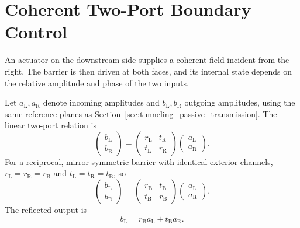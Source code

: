 \section{Coherent Two-Port Boundary Control}
\label{sec:tunneling_coherent_boundary_control}

An actuator on the downstream side supplies a coherent field incident from the right. The barrier is then driven at both faces, and its internal state depends on the relative amplitude and phase of the two inputs.

Let $a_{\mathrm L},a_{\mathrm R}$ denote incoming amplitudes and $b_{\mathrm L},b_{\mathrm R}$ outgoing amplitudes, using the same reference planes as \hyperref[sec:tunneling_passive_transmission]{Section~\ref*{sec:tunneling_passive_transmission}}. The linear two-port relation is
\begin{equation}
    \begin{pmatrix}b_{\mathrm L}\\b_{\mathrm R}\end{pmatrix}
    =
    \begin{pmatrix}
        r_{\mathrm L}&t_{\mathrm R}\\
        t_{\mathrm L}&r_{\mathrm R}
    \end{pmatrix}
    \begin{pmatrix}a_{\mathrm L}\\a_{\mathrm R}\end{pmatrix}.
    \label{eq:tunneling_scattering_matrix_general}
\end{equation}
For a reciprocal, mirror-symmetric barrier with identical exterior channels,
$r_{\mathrm L}=r_{\mathrm R}=r_{\mathrm B}$ and
$t_{\mathrm L}=t_{\mathrm R}=t_{\mathrm B}$, so
\begin{equation}
    \begin{pmatrix}b_{\mathrm L}\\b_{\mathrm R}\end{pmatrix}
    =
    \begin{pmatrix}
        r_{\mathrm B}&t_{\mathrm B}\\
        t_{\mathrm B}&r_{\mathrm B}
    \end{pmatrix}
    \begin{pmatrix}a_{\mathrm L}\\a_{\mathrm R}\end{pmatrix}.
    \label{eq:tunneling_scattering_matrix_symmetric}
\end{equation}
The reflected output is
\begin{equation}
    b_{\mathrm L}
    =r_{\mathrm B}a_{\mathrm L}+t_{\mathrm B}a_{\mathrm R}.
    \label{eq:tunneling_active_reflected_amplitude}
\end{equation}
